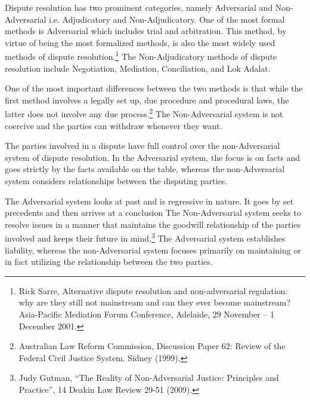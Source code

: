 \setcounter{figure}{0}
\setcounter{table}{0}
\setcounter{footnote}{0}


\begin{multicols}{2}


\noi
Dispute resolution has two prominent categories, namely Adversarial and Non-Adversarial i.e. Adjudicatory and Non-Adjudicatory. One of the most formal methods is Adversarial which includes trial and arbitration. This method, by virtue of being the most formalized methods, is also the most widely used methods of dispute resolution.\footnote{Rick Sarre, Alternative dispute resolution and non-adversarial regulation: why are they still not mainstream and can they ever become mainstream? Asia-Pacific Mediation Forum Conference, Adelaide, 29 November – 1 December 2001.} The Non-Adjudicatory methods of dispute resolution include Negotiation, Mediation, Conciliation, and Lok Adalat.


\noi
One of the most important differences between the two methods is that while the first method
involves a legally set up, due procedure and procedural laws, the latter does not involve any
due process.\footnote{Australian Law Reform Commission, Discussion Paper 62: Review of the Federal Civil Justice System. Sidney (1999).} The Non-Adversarial system is not coercive and the parties can withdraw
whenever they want.

\noi
The parties involved in a dispute have full control over the non-Adversarial system of dispute
resolution. In the Adversarial system, the focus is on facts and goes strictly by the facts
available on the table, whereas the non-Adversarial system considers relationships between the
disputing parties.

\noi
The Adversarial system looks at past and is regressive in nature. It goes by set precedents and
then arrives at a conclusion The Non-Adversarial system seeks to resolve issues in a manner
that maintains the goodwill relationship of the parties involved and keeps their future in
mind.\footnote{Judy Gutman, “The Reality of Non-Adversarial Justice: Principles and Practice”, 14 Deakin Law Review 29-51 (2009).} The Adversarial system establishes liability, whereas the non-Adversarial system focuses primarily on maintaining or in fact utilizing the relationship between the two parties.


\end{multicols}
